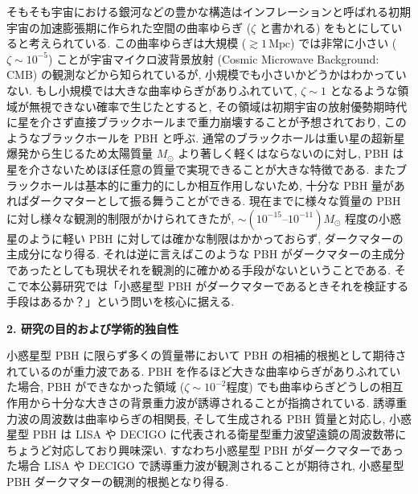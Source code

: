 \documentclass[11pt,a4paper,uplatex,dvipdfmx]{ujarticle} 		%
\newcommand{\研究課題名}{曲率ゆらぎの統計と原始ブラックホール量の精密対応}
\newcommand{\研究機関名}{名古屋大学}
\newcommand{\研究代表者氏名}{多田祐一郎}
\newcommand{\研究期間の最終元号年度}{4}  %
\begin{document}
そもそも宇宙における銀河などの豊かな構造はインフレーションと呼ばれる初期宇宙の加速膨張期に作られた空間の曲率ゆらぎ ($\zeta$ と書かれる) をもとにしていると考えられている.
この曲率ゆらぎは大規模 ($\gtrsim1\,\mathrm{Mpc}$) では非常に小さい ($\zeta\sim10^{-5}$) ことが宇宙マイクロ波背景放射 (Cosmic Microwave Background: CMB) の観測などから知られているが,
小規模でも小さいかどうかはわかっていない.
もし小規模では大きな曲率ゆらぎがありふれていて, $\zeta\sim1$ となるような領域が無視できない確率で生じたとすると, その領域は初期宇宙の放射優勢期時代に星を介さず直接ブラックホールまで重力崩壊することが予想されており,
このようなブラックホールを PBH と呼ぶ.
通常のブラックホールは重い星の超新星爆発から生じるため太陽質量 $M_\odot$ より著しく軽くはならないのに対し,
PBH は星を介さないためほぼ任意の質量で実現できることが大きな特徴である.
またブラックホールは基本的に重力的にしか相互作用しないため, 十分な PBH 量があればダークマターとして振る舞うことができる.
現在までに様々な質量の PBH に対し様々な観測的制限がかけられてきたが, $\sim(10^{-15}\text{--}10^{-11})M_\odot$ 程度の小惑星のように軽い PBH に対しては確かな制限はかかっておらず,
ダークマターの主成分になり得る.
それは逆に言えばこのような PBH がダークマターの主成分であったとしても現状それを観測的に確かめる手段がないということである.
そこで本公募研究では「小惑星型 PBH がダークマターであるときそれを検証する手段はあるか？」という問いを核心に据える.




\begin{mdframed}[roundcorner=0.5zw,
	innertopmargin=0.8zw,innerbottommargin=0.8zw,
	linecolor=black!50,linewidth=0.2zw,
	backgroundcolor=black!10]
	{\bfseries\gtfamily\sffamily\large 2. 研究の目的および学術的独自性}
\end{mdframed}

\noindent
小惑星型 PBH に限らず多くの質量帯において PBH の相補的根拠として期待されているのが重力波である.
PBH を作るほど大きな曲率ゆらぎがありふれていた場合, PBH ができなかった領域 ($\zeta\sim10^{-2}$程度) でも曲率ゆらぎどうしの相互作用から十分な大きさの背景重力波が誘導されることが指摘されている.
誘導重力波の周波数は曲率ゆらぎの相関長, そして生成される PBH 質量と対応し, 小惑星型 PBH は LISA や DECIGO に代表される衛星型重力波望遠鏡の周波数帯にちょうど対応しており興味深い.
すなわち小惑星型 PBH がダークマターであった場合 LISA や DECIGO で誘導重力波が観測されることが期待され, 小惑星型 PBH ダークマターの観測的根拠となり得る.
\end{document}
